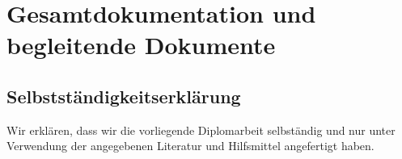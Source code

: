 \chapter[Gesamtdokumentation]{Gesamtdokumentation und begleitende Dokumente}

\section{Selbstständigkeitserklärung}

Wir erklären, dass wir die vorliegende Diplomarbeit selbständig und nur unter Verwendung der angegebenen Literatur und Hilfsmittel angefertigt haben.
\vspace{2cm}

